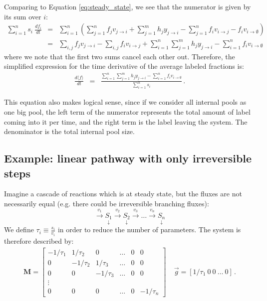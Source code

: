 \documentclass{article}
\newcommand{\fin}{\ensuremath{\langle f \rangle}}
\newcommand{\flux}[2]{\ensuremath{v_{{#1} \rightarrow {#2}}}}
\begin{document}
Comparing to Equation \ref{eq:steady_state}, we see that the numerator is given by its sum over $i$:
\begin{eqnarray}
    \sum_{i=1}^{n} s_i~\frac{d f_i}{dt} &=& \sum_{i=1}^n \left(\sum_{j=1}^{n} f_j\flux{j}{i} + \sum_{j=1}^m h_j y_{j \rightarrow i} - \sum_{j=1}^n f_i \flux{i}{j} - f_i \flux{i}{\emptyset}\right) \\
    &=& \sum_{i,j} f_j\flux{j}{i} - \sum_{i,j} f_i\flux{i}{j} + 
    \sum_{i=1}^n \sum_{j=1}^m h_j y_{j \rightarrow i} - \sum_{i=1}^n f_i \flux{i}{\emptyset}
\end{eqnarray}
where we note that the first two sums cancel each other out. Therefore, the simplified expression for the time derivative of the average labeled fractions is:
\begin{eqnarray}
    \frac{d\fin}{dt} &=& \frac{\sum_{i=1}^n \sum_{j=1}^m h_j y_{j \rightarrow i} - \sum_{i=1}^n f_i \flux{i}{\emptyset}}{\sum_{i=1}^{n} s_i}\,.
\end{eqnarray}

This equation also makes logical sense, since if we consider all internal pools as one big pool, the left term of the numerator represents the total amount of label coming into it per time, and the right term is the label leaving the system. The denominator is the total internal pool size.

\subsection{Example: linear pathway with only irreversible steps}
Imagine a cascade of reactions which is at steady state, but the fluxes are not necessarily equal (e.g. there could be irreversible branching fluxes):
\begin{equation}
    \xrightarrow{v_1} \underset{\downarrow}{S_1} 
    \xrightarrow{v_2} \underset{\downarrow}{S_2}
    \xrightarrow{v_3} \ldots 
    \xrightarrow{v_n} \underset{\downarrow}{S_n}
\end{equation}
We define $\tau_i \equiv \frac{s_i}{v_i}$ in order to reduce the number of parameters. The system is therefore described by:
\begin{eqnarray}
\mathbf{M} =
  \begin{bmatrix}
    -1/\tau_1 & 1/\tau_2 & 0 & \ldots & 0 & 0\\
    0 & -1/\tau_2 & 1/\tau_3 & \ldots & 0 & 0\\
    0 & 0 & -1/\tau_3 & \ldots & 0 & 0\\
    \vdots\\
    0 & 0 & 0 & \ldots & 0 & -1/\tau_n
  \end{bmatrix}
~~~~~
\vec{g} = \left[1/\tau_1~0~0~\ldots~0\right]\,.
\end{eqnarray}
\end{document}
